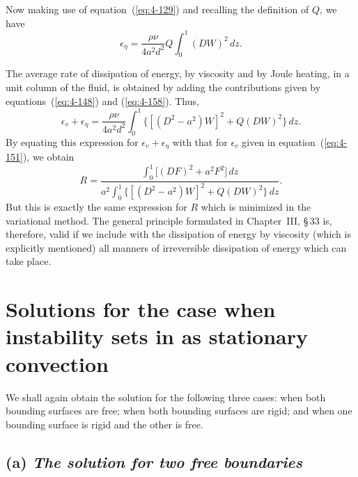 Now making use of equation~(\ref{eq:4-129}) and recalling the definition of $Q$, we have
\begin{equation}
\label{eq:4-158}
\epsilon_\eta = \frac{\rho\nu}{4a^2 d^2}Q\int_0^1 (DW)^2\,dz.
\end{equation}

The average rate of dissipation of energy, by viscosity and by Joule heating, in a unit column of the fluid, is obtained by adding the contributions given by equations~(\ref{eq:4-148}) and (\ref{eq:4-158}). Thus,
\begin{equation}
\label{eq:4-159}
\epsilon_v+\epsilon_\eta = \frac{\rho\nu}{4a^2 d^2}\int_0^1 \bigl\{[(D^2-a^2)W]^2+Q(DW)^2\bigr\}\,dz.
\end{equation}
By equating this expression for $\epsilon_v+\epsilon_\eta$ with that for $\epsilon_v$ given in equation~(\ref{eq:4-151}), we obtain
\begin{equation}
\label{eq:4-160}
R = \frac{\displaystyle\int_0^1\bigl[(DF)^2+a^2 F^2\bigr]\,dz}{a^2\displaystyle\int_0^1\bigl\{[(D^2-a^2)W]^2+Q(DW)^2\bigr\}\,dz}.
\end{equation}
But this is exactly the same expression for $R$ which is minimized in the variational method. The general principle formulated in Chapter~III, \S\,33 is, therefore, valid if we include with the dissipation of energy by viscosity (which is explicitly mentioned) all manners of irreversible dissipation of energy which can take place.

\section{Solutions for the case when instability sets in as stationary convection}\label{sec:44}

We shall again obtain the solution for the following three cases: when both bounding surfaces are free; when both bounding surfaces are rigid; and when one bounding surface is rigid and the other is free.

\subsection*{(a) \emph{The solution for two free boundaries}}

